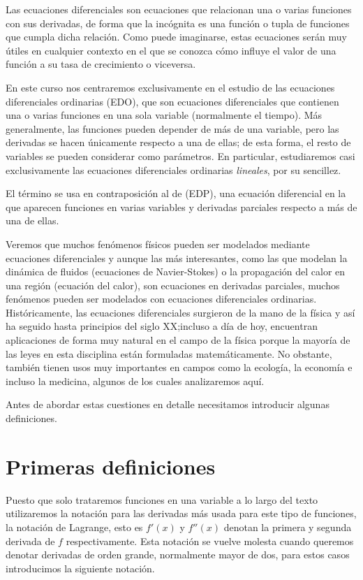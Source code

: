 \documentclass[../ecuaciones_diferenciales.tex]{subfiles}
\begin{document}
Las ecuaciones diferenciales son ecuaciones que relacionan una o varias
funciones con sus derivadas, de forma que la incógnita es una función o tupla de
funciones que cumpla dicha relación. Como puede imaginarse, estas ecuaciones
serán muy útiles en cualquier contexto en el que se conozca cómo influye el
valor de una función a su tasa de crecimiento o viceversa.

En este curso nos centraremos exclusivamente en el estudio de las ecuaciones
diferenciales ordinarias (EDO), que son ecuaciones diferenciales que contienen
una o varias funciones en una sola variable (normalmente el tiempo). Más
generalmente, las funciones pueden depender de más de una variable, pero las
derivadas se hacen únicamente respecto a una de ellas; de esta forma, el resto
de variables se pueden considerar como parámetros. En particular, estudiaremos
casi exclusivamente las ecuaciones diferenciales ordinarias \emph{lineales}, por
su sencillez.

El término  se usa en contraposición
al de  (EDP), una ecuación
diferencial en la que aparecen funciones en varias variables y derivadas
parciales respecto a más de una de ellas.

Veremos que muchos fenómenos físicos pueden ser modelados mediante ecuaciones
diferenciales y aunque las más interesantes, como las que modelan la dinámica de
fluidos (ecuaciones de Navier-Stokes) o la propagación del calor en una región
(ecuación del calor), son ecuaciones en derivadas parciales, muchos fenómenos
pueden ser modelados con ecuaciones diferenciales ordinarias. Históricamente,
las ecuaciones diferenciales surgieron de la mano de la física y así ha seguido
hasta principios del siglo XX;\@ incluso a día de hoy, encuentran aplicaciones de
forma muy natural en el campo de la física porque la mayoría de las leyes en
esta disciplina están formuladas matemáticamente. No obstante, también tienen
usos muy importantes en campos como la ecología, la economía e incluso la
medicina, algunos de los cuales analizaremos aquí.

Antes de abordar estas cuestiones en detalle necesitamos introducir algunas
definiciones.

\section{Primeras definiciones}

Puesto que solo trataremos funciones en una variable a lo largo del texto
utilizaremos la notación para las derivadas más usada para este tipo de
funciones, la notación de Lagrange, esto es \(f'(x)\) y \(f''(x)\) denotan la
primera y segunda derivada de \(f\) respectivamente. Esta notación se vuelve
molesta cuando queremos denotar derivadas de orden grande, normalmente mayor de
dos, para estos casos introducimos la siguiente notación.
\end{document}

